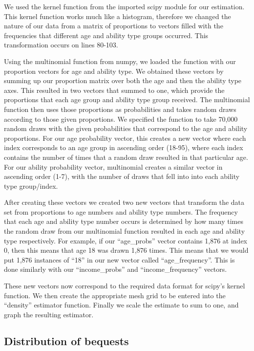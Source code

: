 \documentclass[letterpaper,12pt]{article}
\newcommand{\quotes}[1]{``#1''}
\theoremstyle{definition}
\begin{document}
\begin{spacing}{1.5}
We used the kernel function from the imported scipy module for our estimation. This kernel function works much like a histogram, therefore we changed the nature of our data from a matrix of proportions to vectors filled with the frequencies that different age and ability type groups occurred. This transformation occurs on lines 80-103. 

Using the multinomial function from numpy, we loaded the function with our proportion vectors for age and ability type. We obtained these vectors by summing up our proportion matrix over both the age and then the ability type axes. This resulted in two vectors that summed to one, which provide the proportions that each age group and ability type group received. The multinomial function then uses those proportions as probabilities and takes random draws according to those given proportions. We specified the function to take 70,000 random draws with the given probabilities that correspond to the age and ability proportions. For our age probability vector, this creates a new vector where each index corresponds to an age group in ascending order (18-95), where each index contains the number of times that a random draw resulted in that particular age. For our ability probability vector, multinomial creates a similar vector in ascending order (1-7), with the number of draws that fell into into each ability type group/index.

After creating these vectors we created two new vectors that transform the data set from proportions to age numbers and ability type numbers. The frequency that each age and ability type number occurs is determined by how many times the random draw from our multinomial function resulted in each age and ability type respectively. For example, if our \quotes{age\_probs} vector contains 1,876 at index 0, then this means that age 18 was drawn 1,876 times. This means that we would put 1,876 instances of \quotes{18} in our new vector called \quotes{age\_frequency}. This is done similarly with our \quotes{income\_probs} and \quotes{income\_frequency} vectors.

These new vectors now correspond to the required data format for scipy's kernel function. We then create the appropriate mesh grid to be entered into the \quotes{density} estimator function. Finally we scale the estimate to sum to one, and graph the resulting estimator.

  \subsection{Distribution of bequests}\label{SecDistEst}


\end{spacing}
\end{document}
